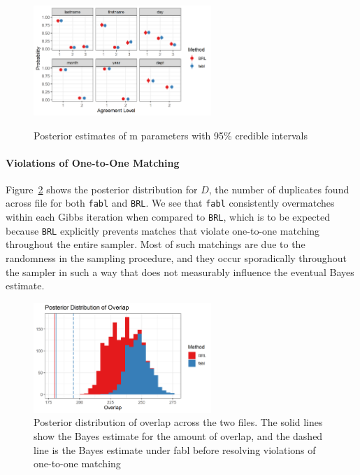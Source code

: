 \documentclass[12pt,letterpaper]{article}
\newcommand{\1}[1]{\mathbb{I}\!\left[#1\right]} %
\begin{document}
\begin{figure}[htbp]
\begin{center}
\includegraphics[width=0.6\textwidth]{../notes/figures/el_salvador/m_posterior_smallP} 
\caption{Posterior estimates of m parameters with 95\% credible intervals}\label{fig:m-and-u}
\label{fig:m-and-u}
\end{center}
\end{figure}



\paragraph{Violations of One-to-One Matching} Figure~\ref{fig:overlap-plot} shows the posterior distribution for \(D\), the number of
duplicates found across file for both \texttt{fabl} and \texttt{BRL}. We
see that \texttt{fabl} consistently overmatches within each Gibbs
iteration when compared to \texttt{BRL}, which is to be expected because
\texttt{BRL} explicitly prevents matches that violate one-to-one
matching throughout the entire sampler. Most of such matchings are due
to the randomness in the sampling procedure, and they occur sporadically
throughout the sampler in such a way that does not measurably influence
the eventual Bayes estimate.

\begin{figure}[t]
	
	{\centering \includegraphics[width=0.6\textwidth]{../notes/figures/el_salvador/overlap_distribution_smallP_bayes} 
		
	}
	
	\caption{Posterior distribution of overlap across the two files. The solid lines show the Bayes estimate for the amount of overlap, and the dashed line is the Bayes estimate under fabl before resolving violations of one-to-one matching}\label{fig:overlap-plot}
\end{figure}
\end{document}

